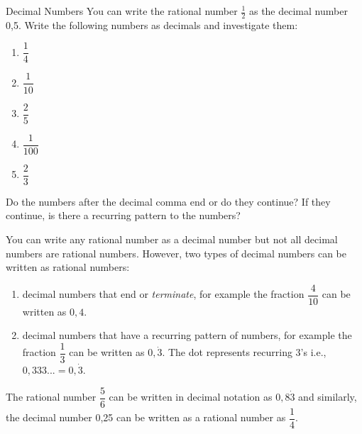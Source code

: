 \begin{Investigation}{Decimal Numbers }
            \nopagebreak
      \label{m38348*id63357}You can write the rational number
$\frac{1}{2}$ as the decimal number 0,5. Write the following numbers as
decimals and investigate them:\par 
      \label{m38348*id63375}\begin{enumerate}[itemsep=5pt, label=\textbf{\arabic*}. ] 
            \label{m38348*uid11}\item 
          $\dfrac{1}{4}$
        \label{m38348*uid12}\item 
          $\dfrac{1}{10}$
        \label{m38348*uid13}\item 
          $\dfrac{2}{5}$
        \label{m38348*uid14}\item 
          $\dfrac{1}{100}$
        \label{m38348*uid15}\item 
          $\dfrac{2}{3}$
        \end{enumerate}
      \label{m38348*id63486}Do the numbers after the decimal comma end or do they continue? If they continue, is there a recurring pattern to the numbers? \par 
\end{Investigation}
      \label{m38348*id63495}You can write any rational number as a decimal number but not all decimal numbers are rational numbers. However, two types of decimal numbers can be written as rational numbers:\par 
      \label{m38348*id63500}\begin{enumerate}[itemsep=5pt, label=\textbf{\arabic*}. ] 
            \label{m38348*uid16}\item decimal numbers that end or \textsl{terminate}, for example the fraction $\dfrac{4}{10}$ can be written as $0,4$.
\label{m38348*uid17}\item decimal numbers that have a recurring pattern of numbers, for example the fraction $\dfrac{1}{3}$ can be written as 
$0,\dot{3}$. 
The dot represents recurring $3$'s i.e.,
$0,333...=0,\dot{3}$.
\end{enumerate}
      \label{m38348*id63576}The rational number $\dfrac{5}{6}$ can be written in decimal notation as $0,8\dot{3}$ and similarly, the decimal number 0,25 can be written as a rational number as $\dfrac{1}{4}$.\par 
\label{m38348*notfhsst!!!underscore!!!id301}
	\par

